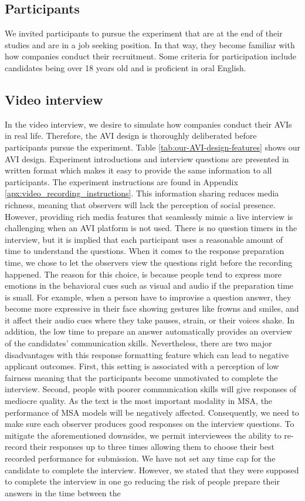 \subsection{Participants}
We invited participants to pursue the experiment that are at the end of their studies and are in a job seeking position. In that way, they become familiar with how companies conduct their recruitment. Some criteria for participation include candidates being over 18 years old and is proficient in oral English. 

\subsection{Video interview}
\label{sec:video_interview}
In the video interview, we desire to simulate how companies conduct their AVIs in real life. Therefore, the AVI design is thoroughly deliberated before participants pursue the experiment. Table \ref{tab:our-AVI-design-features} shows our AVI design. Experiment introductions and interview questions are presented in written format which makes it easy to provide the same information to all participants. The experiment instructions are found in Appendix \ref{apx:video_recording_instructions}. This information sharing reduces media richness, meaning that observers will lack the perception of social presence. However, providing rich media features that seamlessly mimic a live interview is challenging when an AVI platform is not used. There is no question timers in the interview, but it is implied that each participant uses a reasonable amount of time to understand the questions. When it comes to the response preparation time, we chose to let the observers view the questions right before the recording happened. The reason for this choice, is because people tend to express more emotions in the behavioral cues such as visual and audio if the preparation time is small. For example, when a person have to improvise a question answer, they become more expressive in their face showing gestures like frowns and smiles, and it affect their audio cues where they take pauses, strain, or their voices shake. In addition, the low time to prepare an answer automatically provides an overview of the candidates' communication skills. Nevertheless, there are two major disadvantages with this response formatting feature which can lead to negative applicant outcomes. First, this setting is associated with a perception of low fairness meaning that the participants become unmotivated to complete the interview. Second, people with poorer communication skills will give responses of mediocre quality. As the text is the most important modality in MSA, the performance of MSA models will be negatively affected. Consequently, we need to make sure each observer produces good responses on the interview questions. To mitigate the aforementioned downsides, we permit interviewees the ability to re-record their responses up to three times allowing them to choose their best recorded performance for submission. We have not set any time cap for the candidate to complete the interview. However, we stated that they were supposed to complete the interview in one go reducing the risk of people prepare their answers in the time between the 